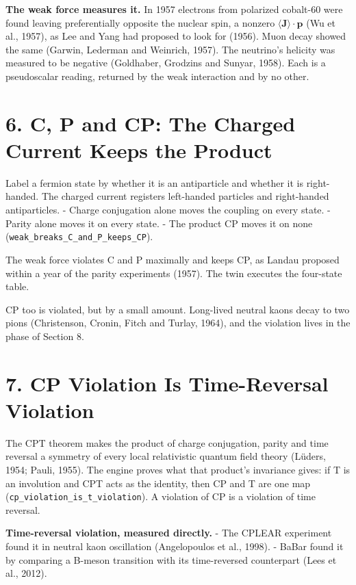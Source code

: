 \documentclass[10pt]{article}
\begin{document}
\textbf{The weak force measures it.} In 1957 electrons from polarized
cobalt-60 were found leaving preferentially opposite the nuclear spin, a
nonzero \(\langle\mathbf J\rangle\cdot\mathbf p\) (Wu et al., 1957), as
Lee and Yang had proposed to look for (1956). Muon decay showed the same
(Garwin, Lederman and Weinrich, 1957). The neutrino's helicity was
measured to be negative (Goldhaber, Grodzins and Sunyar, 1958). Each is
a pseudoscalar reading, returned by the weak interaction and by no
other.

\hypertarget{c-p-and-cp-the-charged-current-keeps-the-product}{%
\section{6. C, P and CP: The Charged Current Keeps the
Product}\label{c-p-and-cp-the-charged-current-keeps-the-product}}

Label a fermion state by whether it is an antiparticle and whether it is
right-handed. The charged current registers left-handed particles and
right-handed antiparticles. - Charge conjugation alone moves the
coupling on every state. - Parity alone moves it on every state. - The
product CP moves it on none
(\texttt{weak\_breaks\_C\_and\_P\_keeps\_CP}).

The weak force violates C and P maximally and keeps CP, as Landau
proposed within a year of the parity experiments (1957). The twin
executes the four-state table.

CP too is violated, but by a small amount. Long-lived neutral kaons
decay to two pions (Christenson, Cronin, Fitch and Turlay, 1964), and
the violation lives in the phase of Section 8.

\hypertarget{cp-violation-is-time-reversal-violation}{%
\section{7. CP Violation Is Time-Reversal
Violation}\label{cp-violation-is-time-reversal-violation}}

The CPT theorem makes the product of charge conjugation, parity and time
reversal a symmetry of every local relativistic quantum field theory
(Lüders, 1954; Pauli, 1955). The engine proves what that product's
invariance gives: if T is an involution and CPT acts as the identity,
then CP and T are one map (\texttt{cp\_violation\_is\_t\_violation}). A
violation of CP is a violation of time reversal.

\textbf{Time-reversal violation, measured directly.} - The CPLEAR
experiment found it in neutral kaon oscillation (Angelopoulos et al.,
1998). - BaBar found it by comparing a B-meson transition with its
time-reversed counterpart (Lees et al., 2012).
\end{document}
